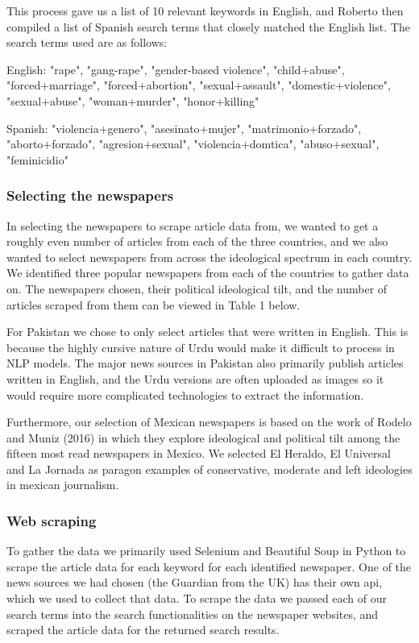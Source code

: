 \documentclass{article}
\begin{document}
{{{This process gave us a list of 10 relevant keywords in English, and Roberto then compiled a list of Spanish search terms that closely matched the English list. The search terms used are as follows:

English: {"rape", "gang-rape", "gender-based violence", "child+abuse", "forced+marriage", "forced+abortion", "sexual+assault", "domestic+violence", "sexual+abuse", "woman+murder", "honor+killing"}

Spanish: {"violencia+genero", "asesinato+mujer", "matrimonio+forzado", "aborto+forzado", "agresion+sexual", "violencia+domtica", "abuso+sexual", "feminicidio"}
                }
\subsubsection{Selecting the newspapers}{ 
In selecting the newspapers to scrape article data from, we wanted to get a roughly even number of articles from each of the three countries, and we also wanted to select newspapers from across the ideological spectrum in each country. We identified three popular newspapers from each of the countries to gather data on. The newspapers chosen, their political ideological tilt, and the number of articles scraped from them can be viewed in Table 1 below.

For Pakistan we chose to only select articles that were written in English. This is because the highly cursive nature of Urdu would make it difficult to process in NLP models. The major news sources in Pakistan also primarily publish articles written in English, and the Urdu versions are often uploaded as images so it would require more complicated technologies to extract the information.

Furthermore, our selection of Mexican newspapers is based on the work of Rodelo and Muniz (2016) in which they explore ideological and political tilt among the fifteen most read newspapers in Mexico. We selected El Heraldo, El Universal and La Jornada as paragon examples of conservative, moderate and left ideologies in mexican journalism.}

\subsubsection{Web scraping}{
To gather the data we primarily used Selenium and Beautiful Soup in Python to scrape the article data for each keyword for each identified newspaper. One of the news sources we had chosen (the Guardian from the UK) has their own api, which we used to collect that data. To scrape the data we passed each of our search terms into the search functionalities on the newspaper websites, and scraped the article data for the returned search results. 

}}}
\end{document}
